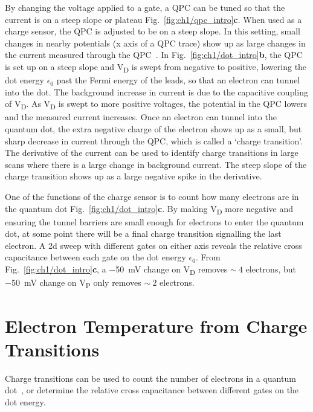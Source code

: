 By changing the voltage applied to a gate, a QPC can be tuned so that the current is on a steep slope or plateau Fig.~\ref{fig:ch1/qpc_intro}\textbf{c}. When used as a charge sensor, the QPC is adjusted to be on a steep slope. In this setting, small changes in nearby potentials (x axis of a QPC trace) show up as large changes in the current measured through the QPC~\cite{cs_design}. In Fig.~\ref{fig:ch1/dot_intro}\textbf{b}, the QPC is set up on a steep slope and V\textsubscript{D} is swept from negative to positive, lowering the dot energy $\epsilon_0$ past the Fermi energy of the leads, so that an electron can tunnel into the dot. The background increase in current is due to the capacitive coupling of V\textsubscript{D}. As V\textsubscript{D} is swept to more positive voltages, the potential in the QPC lowers and the measured current increases. Once an electron can tunnel into the quantum dot, the extra negative charge of the electron shows up as a small, but sharp decrease in current through the QPC, which is called a `charge transition'. The derivative of the current can be used to identify charge transitions in large scans where there is a large change in background current. The steep slope of the charge transition shows up as a large negative spike in the derivative. 

One of the functions of the charge sensor is to count how many electrons are in the quantum dot Fig.~\ref{fig:ch1/dot_intro}\textbf{c}. By making V\textsubscript{D} more negative and ensuring the tunnel barriers are small enough for electrons to enter the quantum dot, at some point there will be a final charge transition signalling the last electron. A 2d sweep with different gates on either axis reveals the relative cross capacitance between each gate on the dot energy $\epsilon_0$. From Fig.~\ref{fig:ch1/dot_intro}\textbf{c}, a \qty{-50}{mV} change on V\textsubscript{D} removes $\sim~4$ electrons, but \qty{-50}{mV} change on V\textsubscript{P} only removes $\sim~2$ electrons.



\section{Electron Temperature from Charge Transitions}



Charge transitions can be used to count the number of electrons in a quantum dot~\cite{electron_counting}, or determine the relative cross capacitance between different gates on the dot energy.

